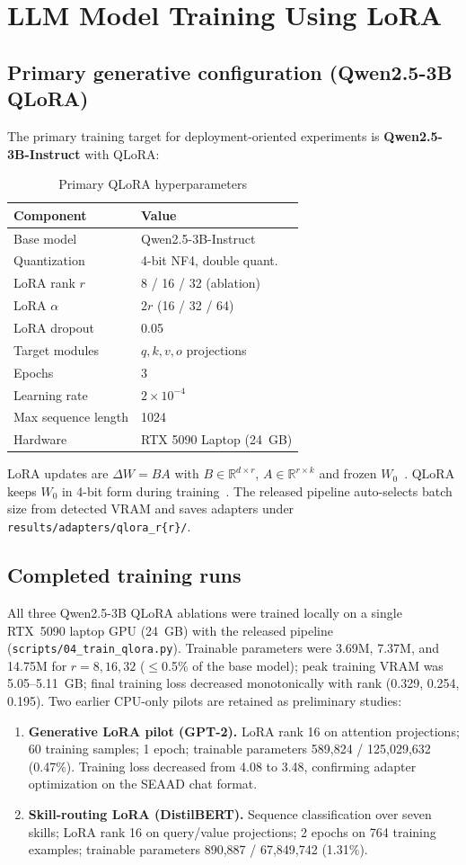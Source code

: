 \documentclass[conference]{IEEEtran}
\begin{document}
\section{LLM Model Training Using LoRA}
\label{sec:training}
\subsection{Primary generative configuration (Qwen2.5-3B QLoRA)}
The primary training target for deployment-oriented experiments is \textbf{Qwen2.5-3B-Instruct} with QLoRA:
\begin{table}[tbp]
\centering
\caption{Primary QLoRA hyperparameters}
\label{tab:hparams}
\begin{tabular}{ll}
\toprule
Component & Value \\
\midrule
Base model & Qwen2.5-3B-Instruct \\
Quantization & 4-bit NF4, double quant. \\
LoRA rank $r$ & 8 / 16 / 32 (ablation) \\
LoRA $\alpha$ & $2r$ (16 / 32 / 64) \\
LoRA dropout & 0.05 \\
Target modules & $q,k,v,o$ projections \\
Epochs & 3 \\
Learning rate & $2\times10^{-4}$ \\
Max sequence length & 1024 \\
Hardware & RTX 5090 Laptop (24~GB) \\
\bottomrule
\end{tabular}
\end{table}
LoRA updates are $\Delta W = BA$ with $B\in\mathbb{R}^{d\times r}$, $A\in\mathbb{R}^{r\times k}$ and frozen $W_0$~\cite{hu2021lora}. QLoRA keeps $W_0$ in 4-bit form during training~\cite{dettmers2023qlora}. The released pipeline auto-selects batch size from detected VRAM and saves adapters under \texttt{results/adapters/qlora\_r\{r\}/}.
\subsection{Completed training runs}
All three Qwen2.5-3B QLoRA ablations were trained locally on a single RTX~5090 laptop GPU (24~GB) with the released pipeline (\texttt{scripts/04\_train\_qlora.py}). Trainable parameters were 3.69M, 7.37M, and 14.75M for $r{=}8,16,32$ ($\leq$0.5\% of the base model); peak training VRAM was 5.05--5.11~GB; final training loss decreased monotonically with rank (0.329, 0.254, 0.195).
Two earlier CPU-only pilots are retained as preliminary studies:
\begin{enumerate}
\item \textbf{Generative LoRA pilot (GPT-2).} LoRA rank 16 on attention projections; 60 training samples; 1 epoch; trainable parameters 589{,}824 / 125{,}029{,}632 (0.47\%). Training loss decreased from 4.08 to 3.48, confirming adapter optimization on the SEAAD chat format.
\item \textbf{Skill-routing LoRA (DistilBERT).} Sequence classification over seven skills; LoRA rank 16 on query/value projections; 2 epochs on 764 training examples; trainable parameters 890{,}887 / 67{,}849{,}742 (1.31\%).
\end{enumerate}
\end{document}
